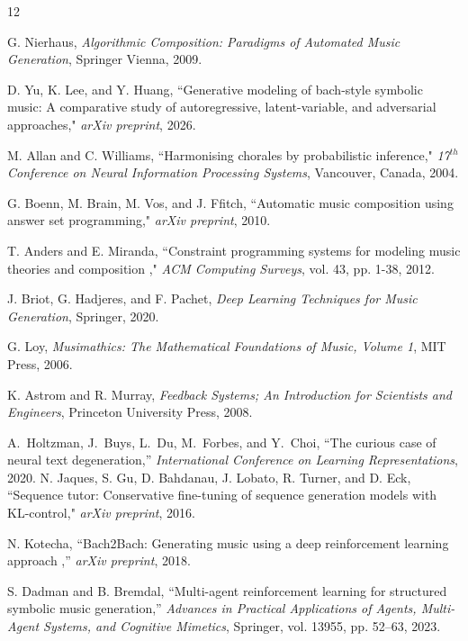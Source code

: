 \documentclass[letterpaper, 10 pt, conference]{ieeeconf}
\begin{document}
\begin{thebibliography}{12}

G.  Nierhaus, \emph{Algorithmic Composition: Paradigms of Automated Music Generation}, Springer Vienna, 2009.

D. Yu, K. Lee, and Y. Huang, \textquotedblleft  Generative modeling of bach-style symbolic music: A comparative study of autoregressive, latent-variable, and adversarial approaches," \emph{arXiv preprint}, 2026.






M. Allan and C. Williams, \textquotedblleft  Harmonising chorales by probabilistic inference,"  \emph{17$^{th}$ Conference on Neural Information Processing Systems}, Vancouver, Canada, 2004.

G. Boenn, M. Brain, M. Vos, and J. Ffitch, \textquotedblleft  Automatic music composition using answer set programming," \emph{arXiv preprint}, 2010.

T. Anders and E. Miranda, \textquotedblleft  Constraint programming systems for modeling music theories and composition
," \emph{ACM Computing Surveys}, vol. 43, pp. 1-38, 2012.

J. Briot, G. Hadjeres, and F. Pachet, \emph{Deep Learning Techniques for
Music Generation}, Springer, 
 2020.

G. Loy, \emph{Musimathics: The Mathematical Foundations of Music, Volume 1}, MIT Press, 
 2006.

K. Astrom and
R. Murray, \emph{Feedback Systems; An Introduction for Scientists and Engineers},   Princeton University Press, 
 2008.
 
A.~Holtzman, J.~Buys, L.~Du, M.~Forbes, and Y.~Choi,
``The curious case of neural text degeneration,''
\emph{International Conference on Learning Representations}, 2020.
N. Jaques, S. Gu, D. Bahdanau, J. Lobato, R. Turner, and D. Eck, \textquotedblleft Sequence tutor: Conservative fine-tuning of sequence generation models with KL-control," \emph{arXiv preprint}, 
 2016.


N. Kotecha,
``Bach2Bach: Generating music using a deep reinforcement learning approach
,''
\emph{arXiv preprint}, 2018.

S. Dadman and B. Bremdal,
``Multi-agent reinforcement learning for structured symbolic music generation,''
\emph{Advances in Practical Applications of Agents, Multi-Agent Systems, and Cognitive Mimetics}, Springer, vol. 13955, pp. 52--63,  2023.


\end{thebibliography}
\end{document}
